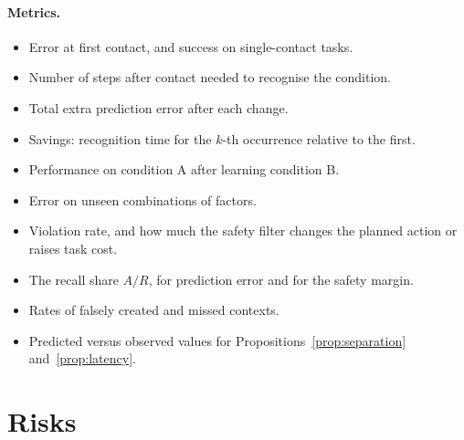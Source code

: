 \documentclass[10pt]{article}
\begin{document}
\paragraph{Metrics.}
\begin{itemize}
  \item Error at first contact, and success on single-contact tasks.
  \item Number of steps after contact needed to recognise the condition.
  \item Total extra prediction error after each change.
  \item Savings: recognition time for the $k$-th occurrence relative to the first.
  \item Performance on condition A after learning condition B.
  \item Error on unseen combinations of factors.
  \item Violation rate, and how much the safety filter changes the planned action or raises task cost.
  \item The recall share $A/R$, for prediction error and for the safety margin.
  \item Rates of falsely created and missed contexts.
  \item Predicted versus observed values for Propositions~\ref{prop:separation} and~\ref{prop:latency}.
\end{itemize}

\section{Risks}
\end{document}
